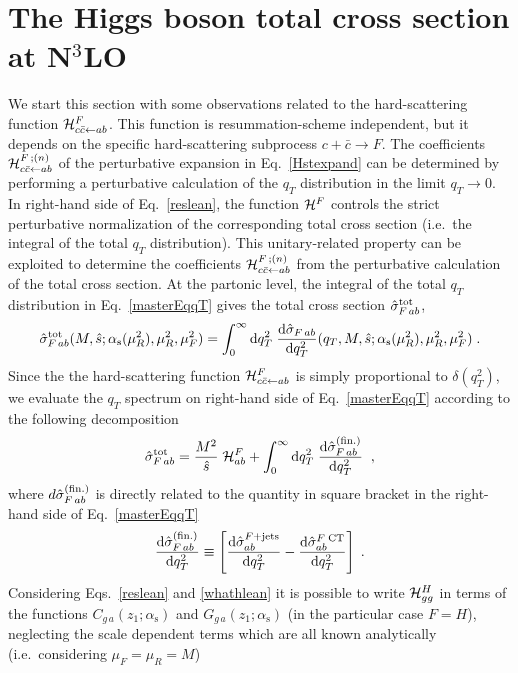 \documentclass[12pt]{article}
\def\beeq{\begin{eqnarray}}
\def\eeeq{\end{eqnarray}}
\DeclareRobustCommand{\as}{\ensuremath{\alpha_{\mathrm{s}}}}
\newcommand\f[2]{\frac{#1}{#2}}
\def\to{\rightarrow}
\def\ito{\leftarrow}
\DeclareRobustCommand{\qt}{q_T}
\DeclareRobustCommand{\rd}{\ensuremath{\mathrm{d}}}
\begin{document}
\section{The Higgs boson total cross section at N$^\text{3}$LO}
\label{sec:numforCN3}
We start this section with some observations related to the hard-scattering function ${\cal H}_{c{\bar c} \ito ab}^{F}$. This function is resummation-scheme independent, but it depends on the specific hard-scattering subprocess $c + {\bar c} \to F$. The coefficients ${\cal H}_{c{\bar c} \ito ab}^{F \,;(n)}$ of the perturbative expansion in Eq.~\eqref{Hstexpand} can be determined by performing a perturbative calculation of the $\qt$ distribution in the limit $\qt \to 0$. In right-hand side of Eq.~\eqref{reslean},  the function ${\cal H}^{F}$ controls the strict perturbative normalization of the corresponding total cross section (i.e.\ the integral of the total $\qt$ distribution). This unitary-related property can be exploited to determine the coefficients ${\cal H}_{c{\bar c} \ito ab}^{F \,;(n)}$ from the perturbative calculation of the total cross section.  At the partonic level, the integral of the total $\qt$ distribution in Eq.~\eqref{masterEqqT} gives the total cross section ${\hat \sigma}_{F \,ab}^{{\rm {tot}}}$,
\begin{equation}
\label{restotp}
{\hat \sigma}_{F \,ab}^{{\rm {tot}}}(M,{\hat s};
\as(\mu_R^2),\mu_R^2,\mu_F^2)
 = \int_0^{\infty} \rd\qt^2 \;
\f{\rd{\hat \sigma}_{F \,ab}}{\rd \qt^2}(\qt,M,{\hat s};
\as(\mu_R^2),\mu_R^2,\mu_F^2) 
 \;.
\end{equation}
Since the the hard-scattering function ${\cal H}_{c{\bar c} \ito ab}^{F}$ is simply proportional to $\delta(\qt^{2})$, we evaluate the $\qt$ spectrum on right-hand side of Eq.~\eqref{masterEqqT} according to the following decomposition
\beeq
\label{sigtotrel} 
{\hat \sigma}_{F \,ab}^{{\rm {tot}}}
 = \f{M^2}{\hat s} \;{\cal H}_{ab}^F 
+ \int_0^{\infty} \rd\qt^2 \;
\f{\rd{\hat \sigma}_{F \,ab}^{(\rm fin.)}}{\rd \qt^2}  \;\;,
\eeeq
where $d{\hat \sigma}_{F \,ab}^{(\rm fin.)}$ is directly related to the quantity in square bracket in the right-hand side of Eq.~\eqref{masterEqqT}
\beeq
\label{sigfin}
\f{\rd{\hat \sigma}_{F \,ab}^{(\rm fin.)}}{\rd \qt^2} \equiv \left[ \f{\rd{\hat \sigma}_{ab}^{F+{\rm jets}}}{\rd \qt^2} - \f{\rd{\hat \sigma}_{ab}^{F\;{\rm CT}}}{\rd \qt^2}\right]\;.
\eeeq
Considering Eqs.~\eqref{reslean} and \eqref{whathlean} it is possible to write ${\cal H}_{gg}^H$ in terms of the functions $C_{g \,a}(z_1;\as)$ and $G_{g \,a}(z_1;\as)$ (in the particular case $F=H$), neglecting the scale dependent terms which are all known analytically (i.e.\ considering $\mu_{F}=\mu_{R}=M$) 
\end{document}
